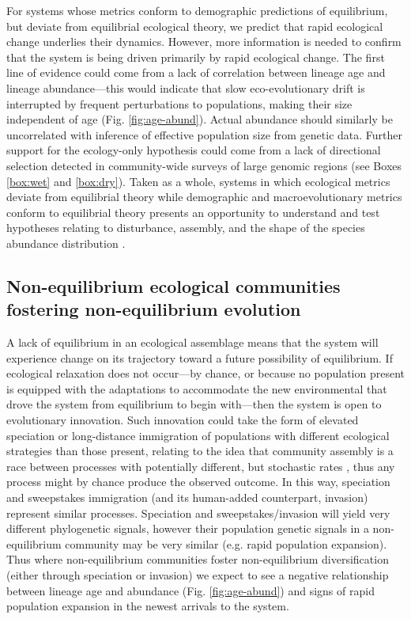 \documentclass[12pt]{article}
\newcounter{Box}
\begin{document}
For systems whose metrics conform to demographic predictions of
equilibrium, but deviate from equilibrial ecological theory, we
predict that rapid ecological change underlies their
dynamics. However, more information is needed to confirm that the
system is being driven primarily by rapid ecological change. The first
line of evidence could come from a lack of correlation between lineage
age and lineage abundance---this would indicate that slow
eco-evolutionary drift is interrupted by frequent perturbations to
populations, making their size independent of age
(Fig. \ref{fig:age-abund}). Actual abundance should similarly be
uncorrelated with inference of effective population size from genetic
data. Further support for the ecology-only hypothesis could come from
a lack of directional selection detected in community-wide surveys of
large genomic regions (see Boxes \ref{box:wet} and
\ref{box:dry}). Taken as a whole, systems in which ecological metrics
deviate from equilibrial theory while demographic and
macroevolutionary metrics conform to equilibrial theory presents an
opportunity to understand and test hypotheses relating to disturbance,
assembly, and the shape of the species abundance distribution
\citep[e.g.;][]{Harte2011-um}.

\subsection{Non-equilibrium ecological communities fostering non-equilibrium evolution}

A lack of equilibrium in an ecological assemblage means that the
system will experience change on its trajectory toward a future
possibility of equilibrium. If ecological relaxation does not
occur---by chance, or because no population present is equipped with
the adaptations to accommodate the new environmental that drove the
system from equilibrium to begin with---then the system is open to
evolutionary innovation.  Such innovation could take the form of
elevated speciation or long-distance immigration of populations with
different ecological strategies than those present, relating to the
idea that community assembly is a race between processes with
potentially different, but stochastic rates \citep{Vanoverbeke2015-ym},
thus any process might by chance produce the observed outcome. In this
way, speciation and sweepstakes immigration (and its human-added
counterpart, invasion) represent similar processes. Speciation and
sweepstakes/invasion will yield very different phylogenetic signals,
however their population genetic signals in a non-equilibrium
community may be very similar (e.g. rapid population expansion). Thus
where non-equilibrium communities foster non-equilibrium
diversification (either through speciation or invasion) we expect to
see a negative relationship between lineage age and abundance (Fig.
\ref{fig:age-abund}) and signs of rapid population expansion in the
newest arrivals to the system.
\end{document}
